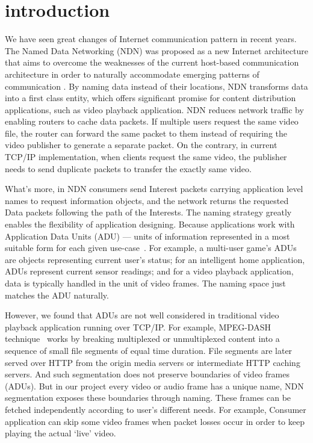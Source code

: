 \section{introduction} %
\label{sec:intro}
We have seen great changes of Internet communication pattern in recent years. The Named Data Networking (NDN) was proposed as a new Internet architecture that aims to overcome the weaknesses of the current host-based communication architecture in order to naturally accommodate emerging patterns of communication \cite{ndn-conext,ndn-tr,NDN-CCR14}. By naming data instead of their locations, NDN transforms data into a first class entity, which offers significant promise for content distribution applications, such as video playback application. NDN reduces network traffic by enabling routers to cache data packets. If multiple users request the same video file, the router can forward the same packet to them instead of requiring the video publisher to generate a separate packet. On the contrary, in current TCP/IP implementation, when clients request the same video, the publisher needs to send duplicate packets to transfer the exactly same video. 

What's more, in NDN consumers send Interest packets carrying application level names to request information objects, and the network returns the requested Data packets following the path of the Interests. The naming strategy greatly enables the flexibility of application designing. Because applications work with Application Data Units (ADU) --- units of information represented in a most suitable form for each given use-case~\cite{Clark1990}. For example, a multi-user game's ADUs are objects representing current user's status; for an intelligent home application, ADUs represent current sensor readings; and for a video playback application, data is typically handled in the unit of video frames. The naming space just matches the ADU naturally. 

However, we found that ADUs are not well considered in traditional video playback application running over TCP/IP. For example, MPEG-DASH technique~\cite{stockhammer2011dynamic} works by breaking multiplexed or unmultiplexed content into a sequence of small file segments of equal time duration. File segments are later served over HTTP from the origin media servers or intermediate HTTP caching servers. And such segmentation does not preserve boundaries of video frames (ADUs). But in our project every video or audio frame has a unique name, NDN segmentation exposes these boundaries through naming. These frames can be fetched independently according to user's different needs. For example, Consumer application can skip some video frames when packet losses occur in order to keep playing the actual `live' video. 

